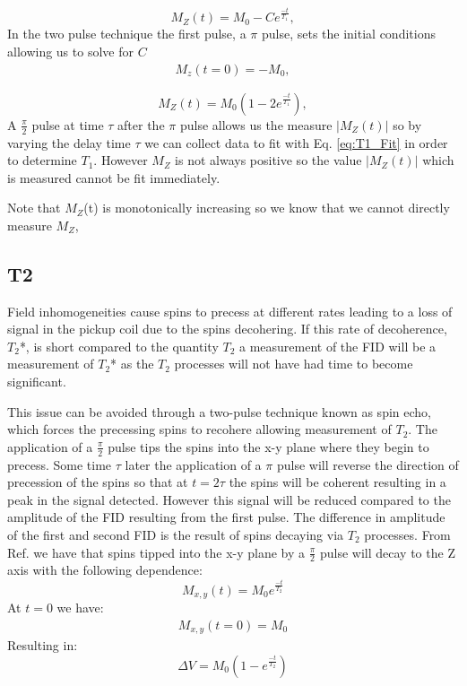 \documentclass[11pt,letterpaper]{article}
\begin{document}
\begin{equation}
\label{eq:T1_Fit}
	M_Z(t) = M_0-Ce^{\frac{-t}{T_1}},
\end{equation}
In the two pulse technique the first pulse, a $\pi$ pulse, sets the initial conditions allowing us to solve for $C$
\begin{align*}
	M_z(t=0)=-M_0,
\end{align*}

\begin{equation}
\label{eq:Mz}
	M_Z(t) = M_0(1-2e^{\frac{-t}{T_1}}),
\end{equation}
A $\frac{\pi}{2}$ pulse at time $\tau$ after the $\pi$ pulse allows us the measure $|M_Z(t)|$ so by varying the delay time $\tau$ we can collect data to fit with Eq. \ref{eq:T1_Fit} in order to determine $T_1$. However $M_Z$ is not always positive so the value $|M_Z(t)|$ which is measured cannot be fit immediately. 

Note that $M_Z$(t) is monotonically increasing so we know that we cannot directly measure $M_Z$, 
\subsection{T2}
Field inhomogeneities cause spins to precess at different rates leading to a loss of signal in the pickup coil due to the spins decohering. If this rate of decoherence, $T_2$*,  is short compared to the quantity $T_2$ a measurement of the FID will be a measurement of $T_2$* as the $T_2$ processes will not have had time to become significant. 


This issue can be avoided through a two-pulse technique known as spin echo, which forces the precessing spins to recohere allowing measurement of $T_2$. The application of a $\frac{\pi}{2}$ pulse tips the spins into the x-y plane where they begin to precess. Some time $\tau$ later the application of a $\pi$ pulse will reverse the direction of precession of the spins so that at $t=2\tau$ the spins will be coherent resulting in a peak in the signal detected. However this signal will be reduced compared to the amplitude of the FID resulting from the first pulse. The difference in amplitude of the first and second FID is the result of spins decaying via $T_2$ processes. 
From Ref. \cite{TeachspinManual} we have that spins tipped into the x-y plane by a $\frac{\pi}{2}$ pulse will decay to the Z axis with the following dependence:
\begin{equation}
M_{x,y}(t)=M_0e^{\frac{-t}{T_2}}
\end{equation}
At $t=0$ we have:
\begin{align}
M_{x,y}(t=0)=M_0
\end{align}
Resulting in:
\begin{equation}
\label{eq:T2_Fit}
\Delta V=M_0(1-e^{\frac{-t}{T_2}})
\end{equation}
\end{document}
